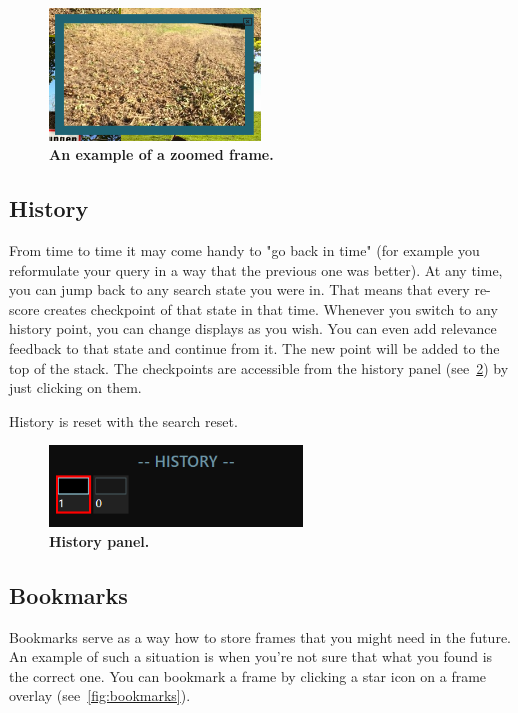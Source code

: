 \begin{figure}[h]
	\centering
	\includegraphics[width=0.5\textwidth]{img/zoom.png}
  \caption{\textbf{An example of a zoomed frame.}}
	\label{fig:zoom}
\end{figure}

\subsection{History}
From time to time it may come handy to "go back in time" (for example you reformulate your query in a way that the previous one was better). At any time, you can jump back to any search state you were in. That means that every re-score creates checkpoint of that state in that time. Whenever you switch to any history point, you can change displays as you wish. You can even add relevance feedback to that state and continue from it. The new point will be added to the top of the stack. The checkpoints are accessible from the history panel (see~\cref{fig:history}) by just clicking on them.

History is reset with the search reset.

\begin{figure}[h]
	\centering
	\includegraphics[width=0.6\textwidth]{img/history-panel.png}
  \caption{\textbf{History panel.}}
	\label{fig:history}
\end{figure}

\subsection{Bookmarks}
Bookmarks serve as a way how to store frames that you might need in the future. An example of such a situation is when you're not sure that what you found is the correct one. You can bookmark a frame by clicking a star icon on a frame overlay (see~\cref{fig:bookmarks}). 

